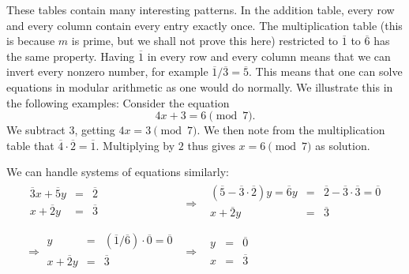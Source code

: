 These tables contain many interesting patterns. In the addition table, every row and
every column contain every entry exactly once. The multiplication table (this is because
$m$ is prime, but we shall not prove this here) restricted to $\overline{1}$ to $\overline{6}$ has the same property.
Having $\overline{1}$ in every row and every column means that we can invert every
nonzero number, for example $\overline{1}/\overline{3}=\overline{5}$. This means that
one can solve equations in modular arithmetic as one would do normally. We illustrate
this in the following examples:
\medskip
Consider the equation
\[
4x+3=6\pmod{7}.
\]
We subtract $3$, getting $4x=3\pmod{7}$. We then note from the multiplication table that
$\overline{4}\cdot\overline{2}=\overline{1}$. Multiplying by $2$ thus gives
$x=6\pmod{7}$ as solution.

We can handle systems of equations similarly:
\begin{eqnarray*}
\begin{array}{rcl}
\overline{3}x+\overline{5}y&=&\overline{2}\\
x+\overline{2}y&=&\overline{3}\\
\end{array}
&\Rightarrow&
\begin{array}{rcl}
(\overline{5}-\overline{3}\cdot\overline{2})y=\overline{6}y&=&\overline{2}-\overline{3}\cdot\overline{3}=\overline{0}\\
x+\overline{2}y&=&\overline{3}\\
\end{array}\\
\Rightarrow
\begin{array}{rcl}
y&=&(\overline{1}/\overline{6})\cdot\overline{0}=\overline{0}\\
x+\overline{2}y&=&\overline{3}\\
\end{array}
&\Rightarrow&
\begin{array}{rcl}
y&=&\overline{0}\\
x&=&\overline{3}\\
\end{array}
\end{eqnarray*}


